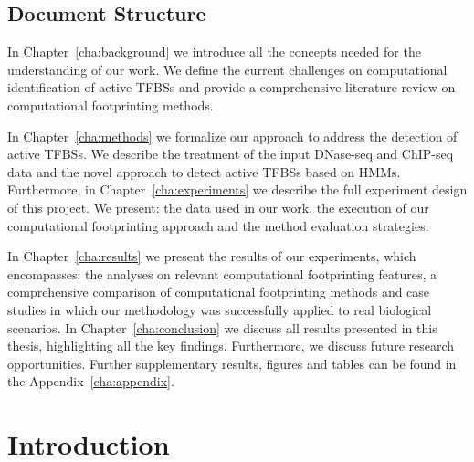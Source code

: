 \section{Document Structure}
\label{sec:document.structure}

In Chapter~\ref{cha:background} we introduce all the concepts needed for the understanding of our work. We define the current challenges on computational identification of active TFBSs and provide a comprehensive literature review on computational footprinting methods.

In Chapter~\ref{cha:methods} we formalize our approach to address the detection of active TFBSs. We describe the treatment of the input DNase-seq and ChIP-seq data and the novel approach to detect active TFBSs based on HMMs. Furthermore, in Chapter~\ref{cha:experiments} we describe the full experiment design of this project. We present: the data used in our work, the execution of our computational footprinting approach and the method evaluation strategies.

In Chapter~\ref{cha:results} we present the results of our experiments, which encompasses: the analyses on relevant computational footprinting features, a comprehensive comparison of computational footprinting methods and case studies in which our methodology was successfully applied to real biological scenarios. In Chapter~\ref{cha:conclusion} we discuss all results presented in this thesis, highlighting all the key findings. Furthermore, we discuss future research opportunities. Further supplementary results, figures and tables can be found in the Appendix~\ref{cha:appendix}.






\chapter{Introduction}
\label{cha:introduction}

\graphicspath{{chapter1/figs/}}

